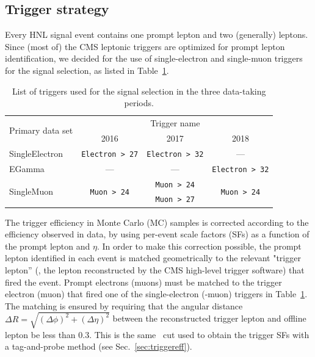 \subsection{Trigger strategy}\label{sec:trigger}
Every HNL signal event contains one prompt lepton and two (generally)
\displ leptons. Since (most of) the CMS leptonic triggers are
optimized for prompt lepton identification,
we decided for the use of single-electron and single-muon triggers for the
signal selection, as listed in Table~\ref{tab:sgnlTriggers}.
\begin{table}[h]
{\small
  \begin{center}
    \caption{\label{tab:sgnlTriggers} List of triggers used for the
      signal selection in the three data-taking periods.}
      \begin{tabular}{|l|c|c|c|}
      \hline
      \multirow{2}{*}{Primary data set} & \multicolumn{3}{c|}{Trigger name}\\
      \cline{2-4}
      & 2016 & 2017 & 2018 \\
      \hline\hline
      SingleElectron & \texttt{\scriptsize Electron > 27} & \texttt{\scriptsize Electron > 32} & --- \\
      \hline
      EGamma         & --- & --- & \texttt{\scriptsize Electron > 32} \\
      \hline
      \multirow{2}{*}{SingleMuon} & \multirow{2}{*}{\texttt{\scriptsize Muon > 24}} & \texttt{\scriptsize Muon > 24} & \multirow{2}{*}{\texttt{\scriptsize Muon > 24}} \\
      & & \texttt{\scriptsize Muon > 27} & \\
      \hline
    \end{tabular}    
  \end{center}}
\end{table}
The trigger efficiency in  Monte Carlo (MC) samples is corrected
according to the efficiency observed in data, by using per-event scale
factors (SFs) as a function of the prompt lepton \pt and $\eta$.
In order to make this correction possible, the prompt lepton
identified in each event is matched geometrically to the relevant
"trigger lepton'' (\ie, the lepton reconstructed by the CMS
high-level trigger software) that fired the event. Prompt electrons
(muons) must be matched to the trigger electron (muon) that fired one
of the single-electron (-muon) triggers in
Table~\ref{tab:sgnlTriggers}.
The matching is ensured by requiring that the angular distance
\(\Delta R=\sqrt{\left(\Delta\phi\right)^2+\left(\Delta\eta\right)^2}\) 
between the reconstructed trigger lepton and offline lepton be less
than 0.3. This is the same \DR\ cut used to obtain the trigger SFs
with a tag-and-probe method (see Sec.~\ref{sec:triggereff}).

